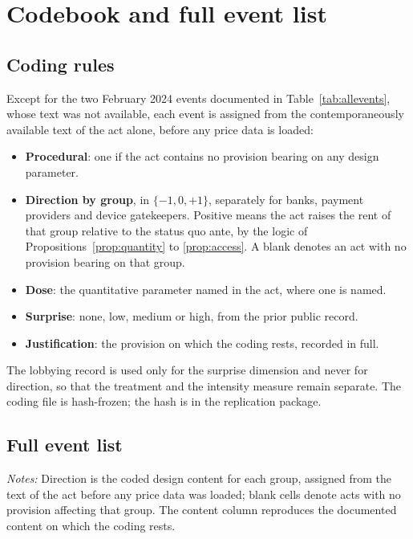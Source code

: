 \documentclass[11pt]{article}
\theoremstyle{plain}\newtheorem{proposition}{Proposition}
\begin{document}
\clearpage
\appendix
\renewcommand{\thesection}{\Alph{section}}

\section{Codebook and full event list}\label{app:codebook}

\subsection{Coding rules}
Except for the two February 2024 events documented in Table~\ref{tab:allevents}, whose text was not available, each event is assigned from the contemporaneously available text of the act alone, before any price data is loaded:
\begin{itemize}\itemsep1pt
\item \textbf{Procedural}: one if the act contains no provision bearing on any design parameter.
\item \textbf{Direction by group}, in $\{-1,0,+1\}$, separately for banks, payment providers and device gatekeepers. Positive means the act raises the rent of that group relative to the status quo ante, by the logic of Propositions~\ref{prop:quantity} to \ref{prop:access}. A blank denotes an act with no provision bearing on that group.
\item \textbf{Dose}: the quantitative parameter named in the act, where one is named.
\item \textbf{Surprise}: none, low, medium or high, from the prior public record.
\item \textbf{Justification}: the provision on which the coding rests, recorded in full.
\end{itemize}
The lobbying record is used only for the surprise dimension and never for direction, so that the treatment and the intensity measure remain separate. The coding file is hash-frozen; the hash is in the replication package.

\subsection{Full event list}
\scriptsize

\normalsize
\noindent\footnotesize\textit{Notes:} Direction is the coded design content for each group, assigned from the text of the act before any price data was loaded; blank cells denote acts with no provision affecting that group. The content column reproduces the documented content on which the coding rests.\normalsize
\end{document}
